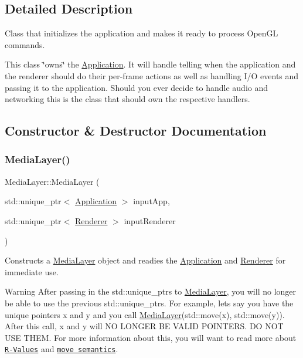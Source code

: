 \subsection{Detailed Description}
Class that initializes the application and makes it ready to process Open\+GL commands. 

This class \char`\"{}owns\char`\"{} the \hyperlink{class_application}{Application}. It will handle telling when the application and the renderer should do their per-\/frame actions as well as handling I/O events and passing it to the application. Should you ever decide to handle audio and networking this is the class that should own the respective handlers. 

\subsection{Constructor \& Destructor Documentation}
\hypertarget{class_media_layer_aea3b3bc36411af90517692b110d2829a}{}\label{class_media_layer_aea3b3bc36411af90517692b110d2829a} 
\subsubsection{\texorpdfstring{Media\+Layer()}{MediaLayer()}}
{\footnotesize\ttfamily Media\+Layer\+::\+Media\+Layer (\begin{DoxyParamCaption}\item[{std\+::unique\+\_\+ptr$<$ \hyperlink{class_application}{Application} $>$}]{input\+App,  }\item[{std\+::unique\+\_\+ptr$<$ \hyperlink{class_renderer}{Renderer} $>$}]{input\+Renderer }\end{DoxyParamCaption})}



Constructs a \hyperlink{class_media_layer}{Media\+Layer} object and readies the \hyperlink{class_application}{Application} and \hyperlink{class_renderer}{Renderer} for immediate use. 

\begin{DoxyWarning}{Warning}
After passing in the std\+::unique\+\_\+ptr\textquotesingle{}s to \hyperlink{class_media_layer}{Media\+Layer}, you will no longer be able to use the previous std\+::unique\+\_\+ptr\textquotesingle{}s. For example, let\textquotesingle{}s say you have the unique pointers x and y and you call \hyperlink{class_media_layer}{Media\+Layer}(std\+::move(x), std\+::move(y)). After this call, x and y will NO L\+O\+N\+G\+ER BE V\+A\+L\+ID P\+O\+I\+N\+T\+E\+RS. DO N\+OT U\+SE T\+H\+EM. For more information about this, you will want to read more about \href{http://thbecker.net/articles/rvalue_references/section_01.html}{\tt R-\/\+Values} and \href{http://thbecker.net/articles/rvalue_references/section_02.html}{\tt move semantics}. 
\end{DoxyWarning}

